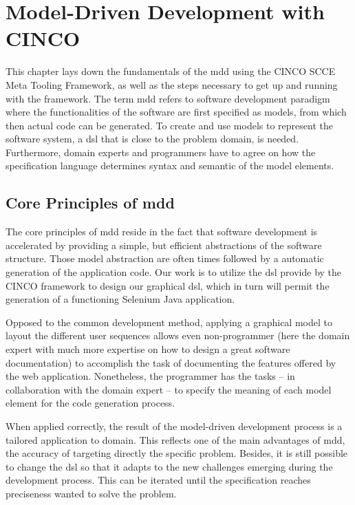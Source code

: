 
\chapter{Model-Driven Development with CINCO}\label{ch:Basis}

This chapter lays down the fundamentals of the \acrfull{mdd} using the CINCO SCCE Meta Tooling Framework, as well as the steps necessary to get up and running with the framework.
The term \acrshort{mdd} refers to software development paradigm where the functionalities of the software are first specified as models, from which then actual code can be generated.
To create and use models to represent the software system, a \acrfull{dsl} that is close to the problem domain, is needed. Furthermore, domain experts and programmers have to agree on how the specification language determines syntax and semantic of the model elements.

\section[CoreMDD]{Core Principles of \acrshort{mdd}}

The core principles of \acrshort{mdd} reside in the fact that software development is accelerated by providing a simple, but efficient abstractions of the software structure. Those model abstraction are often times followed by a automatic generation of the application code. Our work is to utilize the \acrshort{dsl} provide by the CINCO framework to design our graphical \acrshort{dsl}, which in turn will permit the generation of a functioning \gls{Selenium} Java application.

Opposed to the common development method, applying a graphical model to layout the different user sequences allows even non-programmer (here the domain expert with much more expertise on how to design a great software documentation) to accomplish the task of documenting the features offered by the web application. Nonetheless, the programmer has the tasks -- in collaboration with the domain expert -- to specify the meaning of each model element for the code generation process.

When applied correctly, the result of the model-driven development process is a tailored application to domain. This reflects one of the main advantages of \acrshort{mdd}, the accuracy of targeting directly the specific problem. Besides, it is still possible to change the \acrshort{dsl} so that it adapts to the new challenges emerging during the development process. This can be iterated until the specification reaches preciseness wanted to solve the problem.

